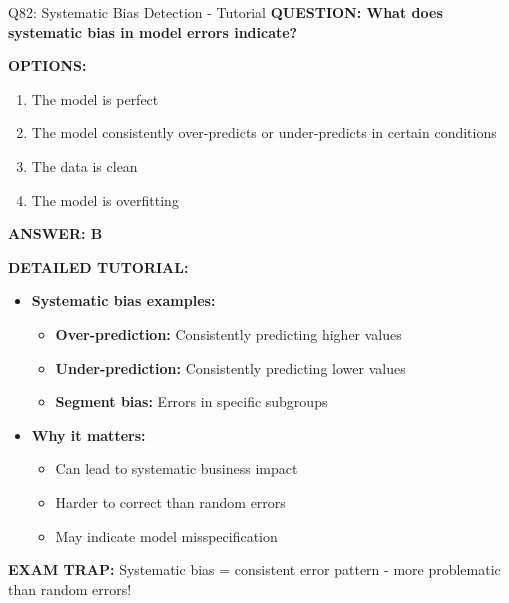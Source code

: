 \documentclass[8pt]{beamer}
\begin{document}
\begin{frame}{Q82: Systematic Bias Detection - Tutorial}
	\fontsize{6.5}{7.5}\selectfont
	\textbf{QUESTION: What does systematic bias in model errors indicate?}
	
	\vspace{0.1cm}
	\textbf{OPTIONS:}
	\begin{enumerate}
		\item The model is perfect
		\item The model consistently over-predicts or under-predicts in certain conditions
		\item The data is clean
		\item The model is overfitting
	\end{enumerate}
	
	\vspace{0.1cm}
	\textcolor{myblue}{\textbf{ANSWER: B}}
	
	\vspace{0.1cm}
	\textbf{DETAILED TUTORIAL:}
	\begin{itemize}
		\item \textbf{Systematic bias examples:}
		\begin{itemize}
			\item \textbf{Over-prediction:} Consistently predicting higher values
			\item \textbf{Under-prediction:} Consistently predicting lower values
			\item \textbf{Segment bias:} Errors in specific subgroups
		\end{itemize}
		\item \textbf{Why it matters:}
		\begin{itemize}
			\item Can lead to systematic business impact
			\item Harder to correct than random errors
			\item May indicate model misspecification
		\end{itemize}
	\end{itemize}
	
	\textcolor{myred}{\textbf{EXAM TRAP:}} Systematic bias = \textcolor{myblue}{consistent error pattern} - more problematic than random errors!
\end{frame}
\end{document}
